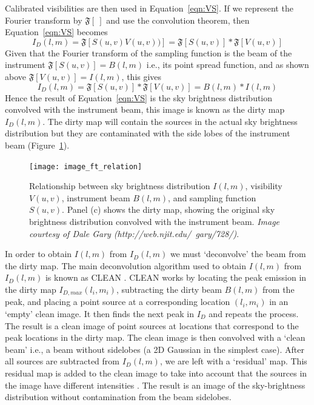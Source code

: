 Calibrated visibilities are then used in Equation~\ref{eqn:VS}. If we represent the Fourier transform by $\mathfrak{F}[~]$ and use the convolution theorem, then Equation~\ref{eqn:VS} becomes
\begin{equation}
I_D(l,m)=\mathfrak{F}[S(u,v)V(u,v))] = \mathfrak{F}[S(u,v)]\ast\mathfrak{F}[V(u,v)]
\label{eqn:VS2}
\end{equation}
Given that the Fourier transform of the sampling function is the beam of the instrument $\mathfrak{F}[S(u,v)] = B(l,m)$ i.e., its point spread function, and as shown above $\mathfrak{F}[V(u,v)] = I(l,m)$, this gives
\begin{equation}
I_D(l,m) = \mathfrak{F}[S(u,v)]\ast\mathfrak{F}[V(u,v)] = B(l,m) \ast I(l,m)
\label{eqn:convol}
\end{equation}
Hence the result of Equation~\ref{eqn:VS} is the sky brightness distribution convolved with the instrument beam, this image is known as the dirty map $I_D(l,m)$. The dirty map will contain the sources in the actual sky brightness distribution but they are contaminated with the side lobes of the instrument beam (Figure~\ref{fig:IVSB}). 
\begin{figure}[!t]
\begin{center}
\texttt{[image: image\_ft\_relation]}
\caption[Sky brightness, visibility, beam, and sampling function]{Relationship between sky brightness distribution $I(l,m)$, visibility $V(u,v)$, instrument beam $B(l,m)$, and sampling function $S(u,v)$. Panel (c) shows the dirty map, showing the original sky brightness distribution convolved with the instrument beam. {\it Image courtesy of Dale Gary (http://web.njit.edu/~gary/728/)}.}
\label{fig:IVSB}
\end{center}
\end{figure}
In order to obtain $I(l,m)$ from $I_D(l,m)$ we must `deconvolve' the beam from the dirty map. The main deconvolution algorithm used to obtain $I(l,m)$ from $I_D(l,m)$ is known as CLEAN \citep{hogbom1974}. CLEAN works by locating the peak emission in the dirty map $I_{D, max}(l_i,m_i)$, subtracting the dirty beam $B(l,m)$ from the peak, and placing a point source at a corresponding location $(l_i,m_i)$ in an `empty' clean image. It then finds the next peak in $I_D$ and repeats the process. The result is a clean image of point sources at locations that correspond to the peak locations in the dirty map. The clean image is then convolved with a `clean beam' i.e., a beam without sidelobes (a 2D Gaussian in the simplest case). After all sources are subtracted from $I_D(l,m)$, we are left with a `residual' map. This residual map is added to the clean image to take into account that the sources in the image have different intensities \citep{hogbom1974}. The result is an image of the sky-brightness distribution without contamination from the beam sidelobes.


